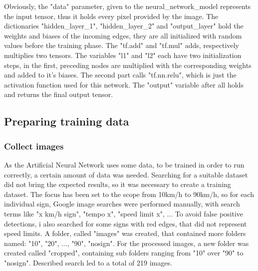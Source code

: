 Obviously, the "data" parameter, given to the neural\_network\_model represents the input tensor, thus it holds every pixel provided by the image. The dictionaries "hidden\_layer\_1", "hidden\_layer\_2" and "output\_layer" hold the weights and biases of the incoming edges, they are all initialized with random values before the training phase. The "tf.add" and "tf.mul" adds, respectively multiplies two tensors. The variables "l1" and "l2" each have two initialization steps, in the first, preceding nodes are multiplied with the corresponding weights and added to it's biases. The second part calls "tf.nn.relu", which is just the activation function used for this network. The "output" variable after all holds and returns the final output tensor. 

\subsection{Preparing training data}
\subsubsection{Collect images}
As the Artificial Neural Network uses some data, to be trained in order to run correctly, a certain amount of data was needed. Searching for a suitable dataset did not bring the expected results, so it was necessary to create a training dataset. The focus has been set to the scope from 10km/h to 90km/h, so for each individual sign, Google image searches were performed manually, with search terms like "x km/h sign", "tempo x", "speed limit x", ...  To avoid false positive detections, i also searched for some signs with red edges, that did not represent speed limits. A folder, called "images" was created, that contained more folders named: "10", "20", ..., "90", "nosign". For the processed images, a new folder was created called "cropped", containing sub folders ranging from "10" over "90" to "nosign". Described search led to a total of 219 images. 


